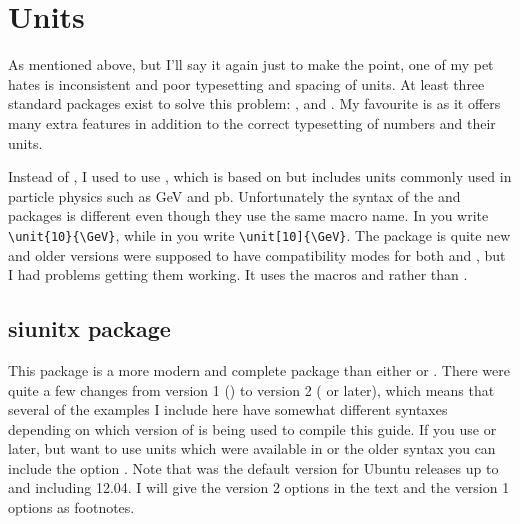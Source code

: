 \section{Units}%
\label{sec:tips:units}

As mentioned above, but I'll say it again just to make the point,
one of my pet hates is inconsistent and poor typesetting and spacing
of units. At least three standard packages exist to solve this
problem: ,  and . My
favourite is  as it offers many extra features in
addition to the correct typesetting of numbers and their units.

Instead of , I used to use , which
is based on  but includes units commonly used in
particle physics such as \si{\GeV} and \si{\pico\barn}. Unfortunately
the syntax of the  and  packages is
different even though they use the same macro name. In
 you write \verb+\unit{10}{\GeV}+, while in
 you write \verb+\unit[10]{\GeV}+. The
 package is quite new and older versions were
supposed to have compatibility modes for both  and
, but I had problems getting them working. It uses the
macros  and  rather than .


\subsection{siunitx package}%
\label{sec:tips:siunitx}

This package is a more modern and complete package than either
 or .
There were quite a few changes from version 1
() to version 2 ( or later), which means that several of the
examples I include here have somewhat different syntaxes depending on
which version of \TeXLive is being used to compile this guide. If you
use  or later, but want to use units which were available in
 or the older syntax you can include the option
. Note that  was the
default version for Ubuntu releases up to and including
12.04.
I will give the  version
2 options in the text and the version 1 options as footnotes.

